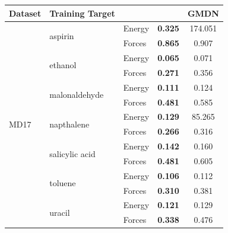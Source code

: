 \begin{tabular}{l|llcc}
\toprule
{Dataset} & Training Target & & \oursacro{} & GMDN\\
\midrule
\multirow{14}{*}{MD17} & \multirow{2}{*}{aspirin} & Energy & \textbf{0.325} & 174.051\\ & &Forces & \textbf{0.865} & 0.907\\
\cmidrule{2-5}
&\multirow{2}{*}{ethanol} & Energy & \textbf{0.065} & 0.071\\ && Forces & \textbf{0.271} & 0.356\\
\cmidrule{2-5}
&\multirow{2}{*}{malonaldehyde} & Energy & \textbf{0.111} & 0.124\\ && Forces & \textbf{0.481} & 0.585\\
\cmidrule{2-5}
&\multirow{2}{*}{napthalene} & Energy & \textbf{0.129} & 85.265\\ && Forces & \textbf{0.266} & 0.316\\
\cmidrule{2-5}
&\multirow{2}{*}{salicylic acid} & Energy & \textbf{0.142} & 0.160\\ && Forces & \textbf{0.481} & 0.605\\
\cmidrule{2-5}
&\multirow{2}{*}{toluene} & Energy & \textbf{0.106} & 0.112\\ && Forces & \textbf{0.310} & 0.381\\
\cmidrule{2-5}
&\multirow{2}{*}{uracil} & Energy & \textbf{0.121} & 0.129\\ && Forces & \textbf{0.338} & 0.476\\
\bottomrule
\end{tabular}